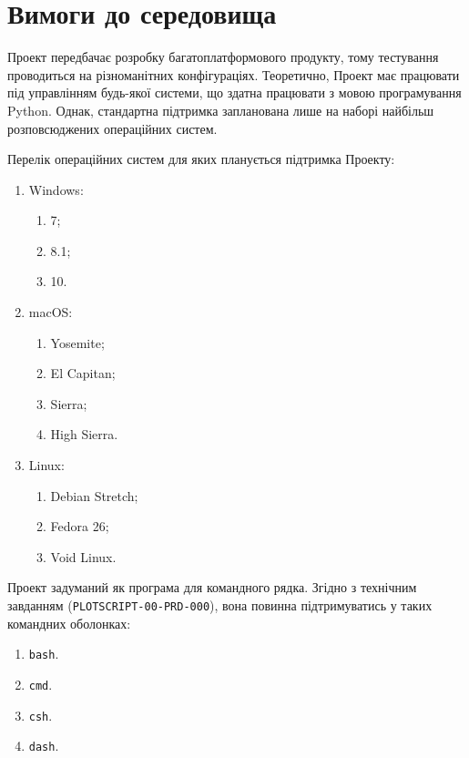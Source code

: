 \documentclass[a4paper,oneside,DIV=12,12pt]{scrartcl}
\newcommand{\theprdcode}{PLOTSCRIPT-00-PRD-000}
\newcommand{\printprdcode}{\texttt{\theprdcode}}
\newcommand{\termemul}[1]{\texttt{#1}}
\begin{document}
	\section{Вимоги до середовища}
		\label{sec:environment-requirements}
		
		Проект передбачає розробку багатоплатформового продукту, тому тестування проводиться на різноманітних конфігураціях. Теоретично, Проект має працювати під управлінням будь-якої системи, що здатна працювати з мовою програмування Python. Однак, стандартна підтримка запланована лише на наборі найбільш розповсюджених операційних систем.
		
		Перелік операційних систем для яких планується підтримка Проекту:
		\begin{enumerate}
			\item Windows:
				\begin{enumerate}
					\item 7;
					\item 8.1;
					\item 10.
				\end{enumerate}
			\item macOS:
				\begin{enumerate}
					\item Yosemite;
					\item El Capitan;
					\item Sierra;
					\item High Sierra.
				\end{enumerate}
			\item Linux:
				\begin{enumerate}
					\item Debian Stretch;
					\item Fedora 26;
					\item Void Linux.
				\end{enumerate}
		\end{enumerate}
		
		Проект задуманий як програма для командного рядка. Згідно з технічним завданням (\printprdcode), вона повинна підтримуватись у таких командних оболонках:
		\begin{enumerate}
			\item \termemul{bash}.
			\item \termemul{cmd}.
			\item \termemul{csh}.
			\item \termemul{dash}.
		\end{enumerate}
		
\end{document}
